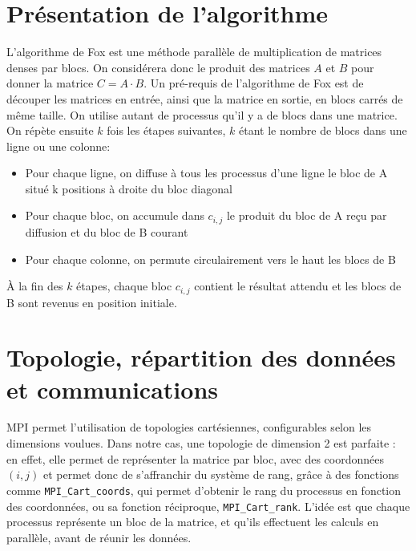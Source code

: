 \documentclass[a4paper,11pt]{article}
\begin{document}
\section{Présentation de l'algorithme}
L'algorithme de Fox est une méthode parallèle de multiplication de matrices denses par blocs. On considérera donc le produit des matrices $A$ et $B$ pour donner la matrice $C=A \cdot B$.
Un pré-requis de l'algorithme de Fox est de découper les matrices en entrée, ainsi que la matrice en sortie, en blocs carrés de même taille. On utilise autant de processus qu'il y a de blocs dans une matrice.
On répète ensuite $k$ fois les étapes suivantes, $k$ étant le nombre de blocs dans une ligne ou une colonne:
\begin{itemize}
\item Pour chaque ligne, on diffuse à tous les processus d'une ligne le bloc de A situé k positions à droite du bloc diagonal
\item Pour chaque bloc, on accumule dans $c_{i,j}$ le produit du bloc de A reçu par diffusion et du bloc de B courant
\item Pour chaque colonne, on permute circulairement vers le haut les blocs de B
\end{itemize}

À la fin des $k$ étapes, chaque bloc $c_{i,j}$ contient le résultat attendu et les blocs de B sont revenus en position initiale.


\section{Topologie, répartition des données et communications}
MPI permet l'utilisation de topologies cartésiennes, configurables selon les dimensions voulues. Dans notre cas, une topologie de dimension 2 est parfaite : en effet, elle permet de représenter la matrice par bloc, avec des coordonnées $(i,j)$ et permet donc de s'affranchir du système de rang, grâce à des fonctions comme \texttt{MPI\_Cart\_coords}, qui permet d'obtenir le rang du processus en fonction des coordonnées, ou sa fonction réciproque, \texttt{MPI\_Cart\_rank}.
L'idée est que chaque processus représente un bloc de la matrice, et qu'ils effectuent les calculs en parallèle, avant de réunir les données.
\end{document}
